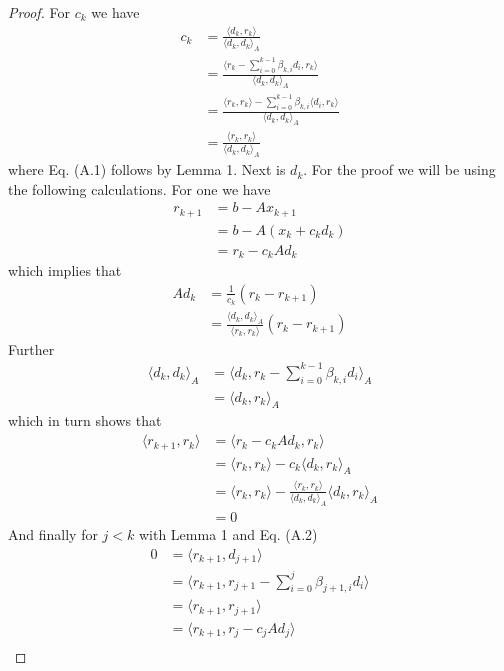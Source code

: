 \documentclass[preprint,12pt,3p]{elsarticle}
\begin{document}
\begin{proof}
For $c_k$ we have
\begin{align}
    c_k&=\frac{\langle d_k, r_k\rangle}{\langle d_k,d_k\rangle_A}\nonumber\\
    &=\frac{\langle r_{k}-\sum_{i=0}^{k-1}\beta_{k,i}d_i, r_k\rangle}{\langle d_k,d_k\rangle_A}\nonumber\\
    &=\frac{\langle r_{k},r_k\rangle-\sum_{i=0}^{k-1}\beta_{k,i}\langle d_i, r_k\rangle}{\langle d_k,d_k\rangle_A}\nonumber\\
    &=\frac{\langle r_k,r_k\rangle}{\langle d_k,d_k\rangle_A}
\end{align}
where Eq. (A.1) follows by Lemma 1. Next is $d_k$. For the proof we will be using the following calculations. For one we have
\begin{align}
    r_{k+1}&=b-Ax_{k+1}\nonumber\\
    &=b-A(x_k+c_kd_k)\nonumber\\
    &=r_k-c_kAd_k
\end{align}
which implies that
\begin{align}
    Ad_k&=\frac{1}{c_k}(r_k-r_{k+1})\nonumber\\
    &=\frac{\langle d_k,d_k\rangle_A}{\langle r_k,r_k\rangle}(r_k-r_{k+1})
\end{align}
Further
\begin{align*}
    \langle d_k,d_k\rangle_A&=\langle d_k,r_k-\sum_{i=0}^{k-1}\beta_{k,i}d_i\rangle_A\\
    &=\langle d_k,r_k\rangle_A
\end{align*}
which in turn shows that
\begin{align}
    \langle r_{k+1},r_k\rangle &= \langle r_k-c_kAd_k,r_k\rangle\nonumber\\
    &=\langle r_k,r_k\rangle-c_k\langle d_k,r_k\rangle_A\nonumber\\
    &=\langle r_k,r_k\rangle-\frac{\langle r_k,r_k\rangle}{\langle d_k,d_k\rangle_A}\langle d_k,r_k\rangle_A\nonumber\\
    &=0
\end{align}
And finally for $j<k$ with Lemma 1 and Eq. (A.2)
\begin{align*}
    0&=\langle r_{k+1},d_{j+1}\rangle\\
    &=\langle r_{k+1},r_{j+1}-\sum_{i=0}^j\beta_{j+1,i}d_i\rangle\\
    &=\langle r_{k+1},r_{j+1}\rangle\\
    &=\langle r_{k+1},r_j-c_jAd_j\rangle\\

\end{align*}
\end{proof}
\end{document}
